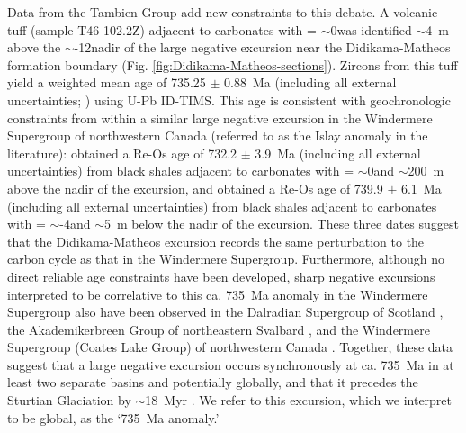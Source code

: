 Data from the Tambien Group add new constraints to this debate. A volcanic tuff (sample T46-102.2Z) adjacent to carbonates with \dC = $\sim$0\permil was identified $\sim$4~m above the $\sim$-12\permil nadir of the large negative excursion near the Didikama-Matheos formation boundary (Fig. \ref{fig:Didikama-Matheos-sections}). Zircons from this tuff yield a weighted mean age of 735.25 $\pm$ 0.88~Ma (including all external uncertainties; \citealp{MacLennan2018a}) using U-Pb ID-TIMS. This age is consistent with geochronologic constraints from within a similar large negative \dC excursion in the Windermere Supergroup of northwestern Canada (referred to as the Islay anomaly in the literature): \citet{Rooney2014a} obtained a Re-Os age of 732.2 $\pm$ 3.9~Ma (including all external uncertainties) from black shales adjacent to carbonates with \dC = $\sim$0\permil and $\sim$200~m above the nadir of the excursion, and \citet{Strauss2014a} obtained a Re-Os age of 739.9 $\pm$ 6.1~Ma (including all external uncertainties) from black shales adjacent to carbonates with \dC = $\sim$-4\permil and $\sim$5~m below the nadir of the excursion. These three dates suggest that the Didikama-Matheos excursion records the same perturbation to the carbon cycle as that in the Windermere Supergroup. Furthermore, although no direct reliable age constraints have been developed, sharp negative \dC excursions interpreted to be correlative to this ca. 735~Ma anomaly in the Windermere Supergroup also have been observed in the Dalradian Supergroup of Scotland \citep{Sawaki2010a}, the Akademikerbreen Group of northeastern Svalbard \citep{Halverson2007a, Hoffman2012a}, and the Windermere Supergroup (Coates Lake Group) of northwestern Canada \citep{Halverson2006a}. Together, these data suggest that a large negative \dC excursion occurs synchronously at ca. 735~Ma in at least two separate basins and potentially globally, and that it precedes the Sturtian Glaciation by $\sim$18~Myr \citep{MacLennan2018a}. We refer to this excursion, which we interpret to be global, as the `735~Ma anomaly.'

